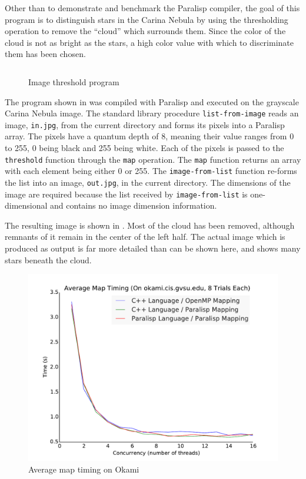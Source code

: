 \documentclass[abstracton]{scrartcl}
\begin{document}
Other than to demonstrate and benchmark the Paralisp compiler, the goal of this program is to distinguish stars in the Carina Nebula by using the thresholding operation to remove the ``cloud'' which surrounds them. Since the color of the cloud is not as bright as the stars, a high color value with which to discriminate them has been chosen.

\begin{figure}
  \centering
  \inputminted{scheme}{code/image-threshold.scm}
  \caption{Image threshold program}\label{fig:image-threshold-program}
\end{figure}

The program shown in  was compiled with Paralisp and executed on the grayscale Carina Nebula image. The standard library procedure \verb|list-from-image| reads an image, \texttt{in.jpg}, from the current directory and forms its pixels into a Paralisp array. The pixels have a quantum depth of 8, meaning their value ranges from 0 to 255, 0 being black and 255 being white. Each of the pixels is passed to the \verb|threshold| function through the \verb|map| operation. The \verb|map| function returns an array with each element being either 0 or 255. The \verb|image-from-list| function re-forms the list into an image, \texttt{out.jpg}, in the current directory. The dimensions of the image are required because the list received by \verb|image-from-list| is one-dimensional and contains no image dimension information.

The resulting image is shown in . Most of the cloud has been removed, although remnants of it remain in the center of the left half. The actual image which is produced as output is far more detailed than can be shown here, and shows many stars beneath the cloud.

\begin{figure}
  \centering
  \includegraphics[width=\textwidth]{images/timing-okami}
  \caption{Average map timing on Okami}\label{fig:timing-okami}
\end{figure}
\end{document}
